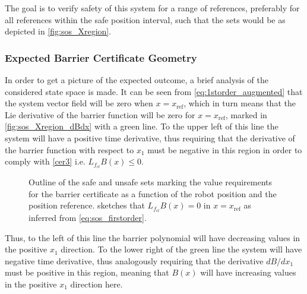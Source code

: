 The goal is to verify safety of this system for a range of references, preferably for all references within the safe position interval, such that the sets would be as depicted in \autoref{fig:sos_Xregion}.

\subsubsection{Expected Barrier Certificate Geometry}
In order to get a picture of the expected outcome, a brief analysis of the considered state space is made.
It can be seen from \autoref{eq:1storder_augmented} that the system vector field will be zero when $x=x_\text{ref}$, which in turn means that the Lie derivative of the barrier function will be zero for $x=x_\text{ref}$, marked in \autoref{fig:sos_Xregion_dBdx} with a green line. 
To the upper left of this line the system will have a positive time derivative, thus requiring that the derivative of the barrier function with respect to $x_1$ must be negative in this region in order to comply with \autoref{cer3} i.e. $L_{f_{cl}}B(x) \leq 0$. 
\begin{figure}[htbp]
	\centering
	\hspace{3mm}
	\hspace{3mm}
	\caption{Outline of the safe and unsafe sets marking the value requirements for the barrier certificate as a function of the robot position and the  position reference. %
		 sketches that $L_{f_{cl}}B(x)=0$  in $x=x_\text{ref}$ as inferred from \autoref{eq:sos_firstorder}. %
	}
	\label{fig:sets_reference}
\end{figure}
Thus, to the left of this line the barrier polynomial will have decreasing values in the positive $x_1$ direction. To the lower right of the green line the system will have negative time derivative, thus analogously requiring that the derivative $dB/dx_1$ must be positive in this region, meaning that $B(x)$ will have increasing values in the positive $x_1$ direction here.

